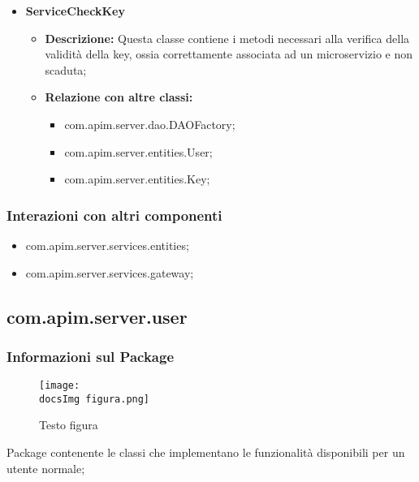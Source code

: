 {{{\begin{itemize}
\begin{itemize}
\begin{itemize}
            \item com.apim.server.entities.API;
            \item com.apim.server.entities.Key;
            \end{itemize}
          \end{itemize}
          \item \textbf{ServiceCheckKey}
            \begin{itemize}
              \item \textbf{Descrizione:} Questa classe contiene i metodi necessari alla verifica della validità della key, ossia correttamente associata ad un microservizio e non scaduta;
              \item \textbf{Relazione con altre classi:}
              \begin{itemize}
              \item com.apim.server.dao.DAOFactory;
              \item com.apim.server.entities.User;
              \item com.apim.server.entities.Key;
              \end{itemize}
            \end{itemize}
          \end{itemize}
          \subsubsection{Interazioni con altri componenti}
          \begin{itemize}
          \item com.apim.server.services.entities;
          \item com.apim.server.services.gateway;
          \end{itemize}
  }
    \subsection{com.apim.server.user}{
    \subsubsection{Informazioni sul Package}
        \begin{figure}[ht]
          \centering
          \texttt{[image: \\docsImg figura.png]}
          \caption{Testo figura}
          \label{Testo figura}
        \end{figure}
        Package  contenente le classi che implementano le funzionalità disponibili per un utente normale;
}}}

